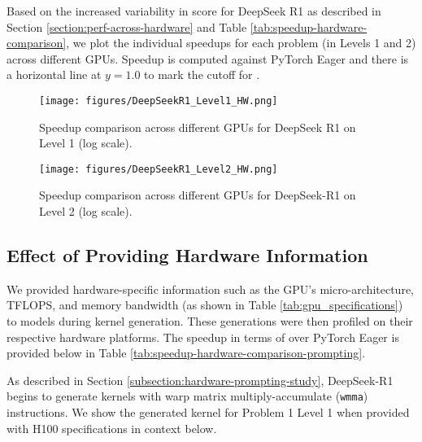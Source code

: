 

\noindent Based on the increased variability in  score for DeepSeek R1 as described in Section \ref{section:perf-across-hardware} and Table \ref{tab:speedup-hardware-comparison}, we plot the individual speedups for each problem (in Levels 1 and 2) across different GPUs. Speedup is computed against PyTorch Eager and there is a horizontal line at $y = 1.0$ to mark the cutoff for .
\begin{figure}[H]
    \centering
    \texttt{[image: figures/DeepSeekR1\_Level1\_HW.png]}
    \caption{Speedup comparison across different GPUs for DeepSeek R1 on Level 1 (log scale).}
    \label{fig:r1_eager_level1_hw}
\end{figure}

\begin{figure}[H]
    \centering
    \texttt{[image: figures/DeepSeekR1\_Level2\_HW.png]}
    \caption{Speedup comparison across different GPUs for DeepSeek-R1 on Level 2 (log scale).}
    \label{fig:r1_eager_level2_hw}
\end{figure}

\subsection{Effect of Providing Hardware Information}

We provided hardware-specific information such as the GPU's micro-architecture, TFLOPS, and memory bandwidth (as shown in Table \ref{tab:gpu_specifications}) to models during kernel generation. These generations were then profiled on their respective hardware platforms. The speedup in terms of  over PyTorch Eager is provided below in Table \ref{tab:speedup-hardware-comparison-prompting}.



As described in Section \ref{subsection:hardware-prompting-study}, DeepSeek-R1 begins to generate kernels with  warp matrix multiply-accumulate (\texttt{wmma}) instructions. We show the generated kernel for Problem 1 Level 1 when provided with H100 specifications in context below.

